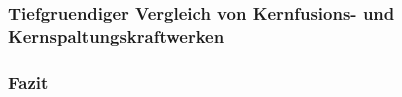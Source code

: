\subsubsection{Tiefgruendiger Vergleich von Kernfusions- und Kernspaltungskraftwerken}
\subsubsection*{Fazit}